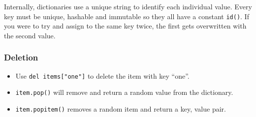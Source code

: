 Internally, dictionaries use a unique string to identify each individual value.
Every key must be unique, hashable and immutable so they all have a constant \texttt{id()}.
If you were to try and assign to the same key twice, the first gets overwritten with the second value.

\subsubsection{Deletion}\label{ssub:deletion}

\begin{itemize}
    \item Use \texttt{del items["one"]} to delete the item with key ``one''.
    \item \texttt{item.pop()} will remove and return a random value from the dictionary.
    \item \texttt{item.popitem()} removes a random item and return a key, value pair.
\end{itemize}
